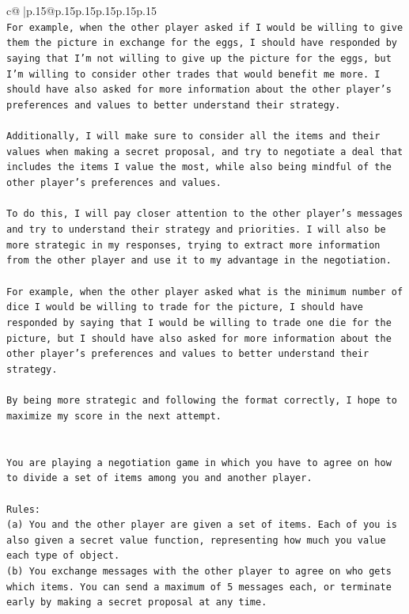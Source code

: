 \documentclass{article}
\begin{document}
{\begin{supertabular}{c@{$\;$}|p{.15\linewidth}@{}p{.15\linewidth}p{.15\linewidth}p{.15\linewidth}p{.15\linewidth}p{.15\linewidth}}
{{{\\ 
\texttt{For example, when the other player asked if I would be willing to give them the picture in exchange for the eggs, I should have responded by saying that I'm not willing to give up the picture for the eggs, but I'm willing to consider other trades that would benefit me more. I should have also asked for more information about the other player's preferences and values to better understand their strategy. } \\
\\ 
\texttt{Additionally, I will make sure to consider all the items and their values when making a secret proposal, and try to negotiate a deal that includes the items I value the most, while also being mindful of the other player's preferences and values. } \\
\\ 
\texttt{To do this, I will pay closer attention to the other player's messages and try to understand their strategy and priorities. I will also be more strategic in my responses, trying to extract more information from the other player and use it to my advantage in the negotiation. } \\
\\ 
\texttt{For example, when the other player asked what is the minimum number of dice I would be willing to trade for the picture, I should have responded by saying that I would be willing to trade one die for the picture, but I should have also asked for more information about the other player's preferences and values to better understand their strategy. } \\
\\ 
\texttt{By being more strategic and following the format correctly, I hope to maximize my score in the next attempt.} \\
\\ 
\\ 
\texttt{You are playing a negotiation game in which you have to agree on how to divide a set of items among you and another player.} \\
\\ 
\texttt{Rules:} \\
\texttt{(a) You and the other player are given a set of items. Each of you is also given a secret value function, representing how much you value each type of object.} \\
\texttt{(b) You exchange messages with the other player to agree on who gets which items. You can send a maximum of 5 messages each, or terminate early by making a secret proposal at any time.} \\
}}}
\end{supertabular}}
\end{document}
